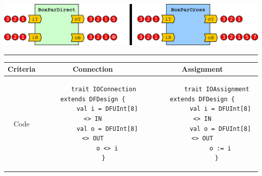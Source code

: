 \begin{table}[t!]
\begin{minipage}[t][13cm][b]{0.64\linewidth}
    \vfill
    \label{fig:BoxTopDraw}
    \includegraphics[width=\linewidth]{graphics/connectivityTokens.pdf}
    \label{fig:BoxTopTokens}
  \end{minipage}%
  \vspace{2ex}
  \hrule
  \vspace{2ex}
  \label{tbl:Box}
  \begin{tabular}{|c|c|c|}
    \hline 
    \textbf{Criteria} & \textbf{Connection \code{<>}} & \textbf{Assignment \code{:=}} \\ 
    \hline
    \begin{minipage}{0.1\textwidth}
      \flushleft
      Code
    \end{minipage} 
    &
    \begin{minipage}[c][1.5cm]{0.4\textwidth}
      \begin{verbatim}
      trait IOConnection extends DFDesign {
        val i = DFUInt[8] <> IN
        val o = DFUInt[8] <> OUT
        o <> i
      }
      \end{verbatim}
    \end{minipage} 
    &  
    \begin{minipage}[c][1.5cm]{0.4\textwidth}
      \begin{verbatim}
        trait IOAssignment extends DFDesign {
          val i = DFUInt[8] <> IN
          val o = DFUInt[8] <> OUT
          o := i
        }
      \end{verbatim}
    \end{minipage} 

\end{tabular}
\end{table}
